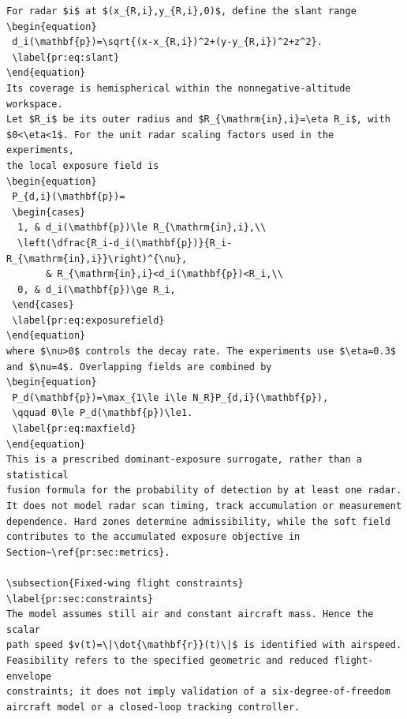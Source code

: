 \documentclass[12pt]{article}
\begin{document}
\begin{verbatim}
For radar $i$ at $(x_{R,i},y_{R,i},0)$, define the slant range
\begin{equation}
 d_i(\mathbf{p})=\sqrt{(x-x_{R,i})^2+(y-y_{R,i})^2+z^2}.
 \label{pr:eq:slant}
\end{equation}
Its coverage is hemispherical within the nonnegative-altitude workspace.
Let $R_i$ be its outer radius and $R_{\mathrm{in},i}=\eta R_i$, with
$0<\eta<1$. For the unit radar scaling factors used in the experiments,
the local exposure field is
\begin{equation}
 P_{d,i}(\mathbf{p})=
 \begin{cases}
  1, & d_i(\mathbf{p})\le R_{\mathrm{in},i},\\
  \left(\dfrac{R_i-d_i(\mathbf{p})}{R_i-R_{\mathrm{in},i}}\right)^{\nu},
       & R_{\mathrm{in},i}<d_i(\mathbf{p})<R_i,\\
  0, & d_i(\mathbf{p})\ge R_i,
 \end{cases}
 \label{pr:eq:exposurefield}
\end{equation}
where $\nu>0$ controls the decay rate. The experiments use $\eta=0.3$
and $\nu=4$. Overlapping fields are combined by
\begin{equation}
 P_d(\mathbf{p})=\max_{1\le i\le N_R}P_{d,i}(\mathbf{p}),
 \qquad 0\le P_d(\mathbf{p})\le1.
 \label{pr:eq:maxfield}
\end{equation}
This is a prescribed dominant-exposure surrogate, rather than a statistical
fusion formula for the probability of detection by at least one radar.
It does not model radar scan timing, track accumulation or measurement
dependence. Hard zones determine admissibility, while the soft field
contributes to the accumulated exposure objective in
Section~\ref{pr:sec:metrics}.

\subsection{Fixed-wing flight constraints}
\label{pr:sec:constraints}
The model assumes still air and constant aircraft mass. Hence the scalar
path speed $v(t)=\|\dot{\mathbf{r}}(t)\|$ is identified with airspeed.
Feasibility refers to the specified geometric and reduced flight-envelope
constraints; it does not imply validation of a six-degree-of-freedom
aircraft model or a closed-loop tracking controller.


\end{verbatim}
\end{document}
